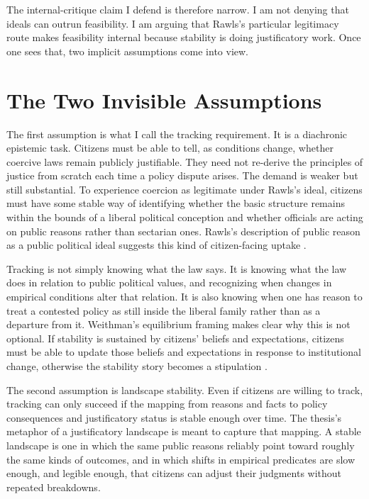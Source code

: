 \documentclass[12pt]{article}
\begin{document}
The internal-critique claim I defend is therefore narrow. I am not denying that ideals can outrun feasibility. I am arguing that Rawls's particular legitimacy route makes feasibility internal because stability is doing justificatory work. Once one sees that, two implicit assumptions come into view.

\section{The Two Invisible Assumptions}

The first assumption is what I call the tracking requirement. It is a diachronic epistemic task. Citizens must be able to tell, as conditions change, whether coercive laws remain publicly justifiable. They need not re-derive the principles of justice from scratch each time a policy dispute arises. The demand is weaker but still substantial. To experience coercion as legitimate under Rawls's ideal, citizens must have some stable way of identifying whether the basic structure remains within the bounds of a liberal political conception and whether officials are acting on public reasons rather than sectarian ones. Rawls's description of public reason as a public political ideal suggests this kind of citizen-facing uptake \parencite[p.~767]{rawls1997public}.

Tracking is not simply knowing what the law says. It is knowing what the law does in relation to public political values, and recognizing when changes in empirical conditions alter that relation. It is also knowing when one has reason to treat a contested policy as still inside the liberal family rather than as a departure from it. Weithman's equilibrium framing makes clear why this is not optional. If stability is sustained by citizens' beliefs and expectations, citizens must be able to update those beliefs and expectations in response to institutional change, otherwise the stability story becomes a stipulation \parencite[p.~207]{Weithman2023FixedPoints}.

The second assumption is landscape stability. Even if citizens are willing to track, tracking can only succeed if the mapping from reasons and facts to policy consequences and justificatory status is stable enough over time. The thesis's metaphor of a justificatory landscape is meant to capture that mapping. A stable landscape is one in which the same public reasons reliably point toward roughly the same kinds of outcomes, and in which shifts in empirical predicates are slow enough, and legible enough, that citizens can adjust their judgments without repeated breakdowns.
\end{document}
